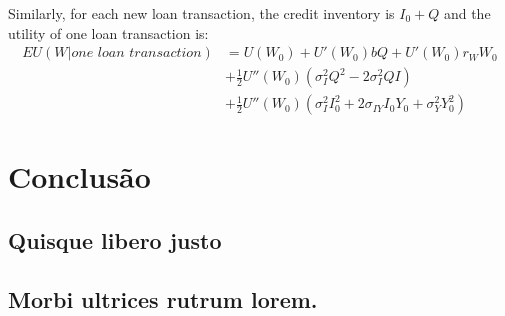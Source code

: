 Similarly, for each new loan transaction, the credit inventory is $I_0 + Q$ and the utility of one loan transaction is:
\begin{equation}
  \begin{aligned}
    EU(W|\textit{one loan transaction}) &= U(W_0) + U'(W_0)bQ +  U'(W_0)r_W W_0 \\ &+ \frac{1}{2}U''(W_0)(\sigma_I^2 Q^2 - 2\sigma_I^2 QI) \\ &+\frac{1}{2}U''(W_0)(\sigma_I^2 I_0^2 + 2\sigma_{IY} I_0 Y_0 + \sigma_Y^2 Y_0^2)
  \end{aligned}
\end{equation}

\chapter{Conclusão}






\begin{apendicesenv}

\partapendices

\chapter{Quisque libero justo}

\lipsum[50]



\end{apendicesenv}


\begin{anexosenv}

\partanexos

\chapter{Morbi ultrices rutrum lorem.}
\lipsum[30]

\end{anexosenv}

\printindex


